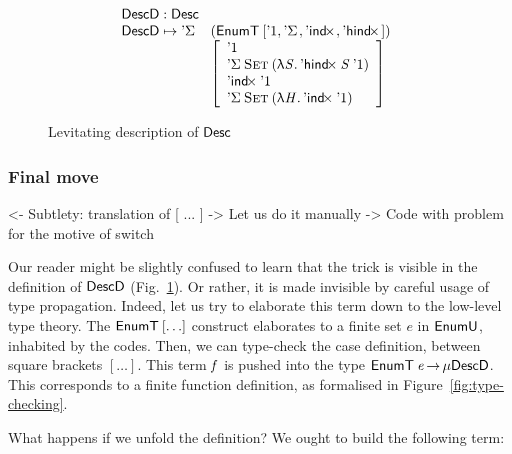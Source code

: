 \begin{figure}

\[\stk{
\DescD : \Desc \\
\begin{array}{@{}ll}
\DescD \mapsto \DSigma{\!}{\!} & (\EnumT{[ \DUnit, \DSigma{\!}{\!}, \DIndx{\!}, \DHindx{\!}{\!} ]}) \\
                           & \left[\begin{array}{l}
                                   \DUnit                                            \\
                                   \DSigma{\Set}{(\LAM{\V{S}} \DHindx{\V{S}}{\DUnit})}   \\
                                   \DIndx{\DUnit}                                    \\
                                   \DSigma{\Set}{(\LAM{\V{H}} \DIndx{\DUnit})}
                                   \end{array}
                             \right]
\end{array}
}\]

\caption{Levitating description of $\Desc$}
\label{fig:desc-levitate}

\end{figure}

\subsubsection{Final move}

\begin{wstructure}
<- Subtlety: translation of [ ... ]
    -> Let us do it manually
        -> Code with problem for the motive of switch
\end{wstructure}

Our reader might be slightly confused to learn that the trick is
visible in the definition of $\DescD$
(Fig.~\ref{fig:desc-levitate}). Or rather, it is made invisible by
careful usage of type propagation. Indeed, let us try to elaborate
this term down to the low-level type theory. The $\EnumT{[ \ldots ]}$
construct elaborates to a finite set $e$ in $\EnumU$, inhabited by the
codes. Then, we can type-check the case definition, between square
brackets $[ \ldots ]$. This term $\V{f}$ is pushed into the type
$\EnumT{\V{e}} \To \Mu{\DescD}$. This corresponds to a finite function
definition, as formalised in Figure~\ref{fig:type-checking}.

What happens if we unfold the definition? We ought to build the following term:

